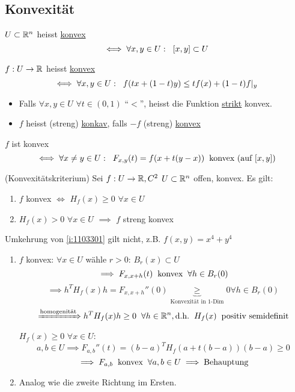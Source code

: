 \subsection{Konvexität}
\begin{Def}
  $U\subset\mathbb{R}^n$ heisst \ul{konvex}
  \[\iff \forall x,y\in U: \hspace{2mm} \left[ x,y \right]\subset U\]
\end{Def}
\begin{Def}
  $f:U\rightarrow\mathbb{R}$ heisst \ul{konvex}
  \[\iff \forall x,y\in U:\hspace{2mm} f(tx+(1-t)y)\leq tf(x)+(1-t)f|_y\]
  \begin{itemize}
    \item Falls $\forall x,y\in U$ $\forall t\in (0,1)$ ``$<$'', heisst die Funktion \ul{strikt} konvex.
    \item $f$ heisst (streng) \ul{konkav}, falls $-f$ (streng) \ul{konvex}
  \end{itemize}
\end{Def}
\begin{Bem}
  $f$ ist konvex
  \[\iff \forall x\neq y\in U:\hspace{2mm} F_{x,y}(t)=f(x+t(y-x))\hspace{2mm}\text{konvex (auf $\left[ x,y \right]$)}\]
\end{Bem}
\begin{Sat}
  (Konvexitätskriterium)
  Sei $f:U\rightarrow\mathbb{R}, C^2$ $U\subset\mathbb{R}^n$ offen, konvex. Es gilt:
  \begin{enumerate}
    \item $f$ konvex $\iff$ $H_f(x)\geq 0$ $\forall x\in U$
      \label{i:1103301}
    \item $H_f(x)>0$ $\forall x\in U$ $\implies$ $f$ streng konvex
      \label{i:1103302}
  \end{enumerate}
\end{Sat}
\begin{Bem}
  Umkehrung von \ref{i:1103301} gilt nicht, z.B. $f(x,y)=x^4+y^4$
\end{Bem}
\begin{Bew}
  \begin{enumerate}
    \item $f$ konvex: $\forall x\in U$ wähle $r>0$: $B_r(x)\subset U$
      \[\implies F_{x,x+h}(t)\hspace{2mm}\text{konvex}\hspace{2mm}\forall h\in B_r(0)\]
      \[\implies h^TH_f(x)h=F_{x,x+h}''(0)\underbrace{\geq}_{\text{Konvexität in 1-Dim}} 0\forall h\in B_r(0)\]
      \[\xRightarrow{\text{homogenität}}h^TH_f(x)h\geq 0\hspace{2mm}\forall h\in \mathbb{R}^n, \text{d.h.}\hspace{2mm} H_f(x)\hspace{2mm}\text{positiv semidefinit}\]
      $H_f(x)\geq 0$ $\forall x\in U$:
      \[a,b\in U\implies F_{a,b}''(t)=(b-a)^TH_f(a+t(b-a))(b-a)\geq 0\]
      \[\implies F_{a,b} \hspace{2mm}\text{konvex}\hspace{2mm}\forall a,b\in U\implies\text{Behauptung}\]
    \item Analog wie die zweite Richtung im Ersten.
  \end{enumerate}
\end{Bew}
